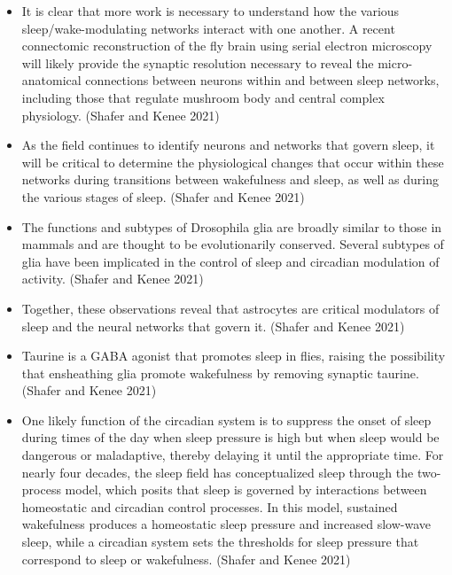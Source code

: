 \documentclass[11pt]{article}
\begin{document}
\begin{itemize}
    \item It is clear that more work is necessary to understand how the various sleep/wake-modulating networks interact with one another. A recent connectomic reconstruction of the fly brain using serial electron microscopy will likely provide the synaptic resolution necessary to reveal the micro-anatomical connections between neurons within and between sleep networks, including those that regulate mushroom body and central complex physiology.
    \parencite{shaferRegulationDrosophilaSleep2021} (Shafer and Kenee 2021)

    \item As the field continues to identify neurons and networks that govern sleep, it will be critical to determine the physiological changes that occur within these networks during transitions between wakefulness and sleep, as well as during the various stages of sleep.
    \parencite{shaferRegulationDrosophilaSleep2021} (Shafer and Kenee 2021)

    \item The functions and subtypes of Drosophila glia are broadly similar to those in mammals and are thought to be evolutionarily conserved.
    Several subtypes of glia have been implicated in the control of sleep and circadian modulation of activity.
    \parencite{shaferRegulationDrosophilaSleep2021} (Shafer and Kenee 2021)

    \item Together, these observations reveal that astrocytes are critical modulators of sleep and the neural networks that govern it.
    \parencite{shaferRegulationDrosophilaSleep2021} (Shafer and Kenee 2021)

    \item Taurine is a GABA agonist that promotes sleep in flies, raising the possibility that ensheathing glia promote wakefulness by removing synaptic taurine.
    \parencite{shaferRegulationDrosophilaSleep2021} (Shafer and Kenee 2021)

    \item One likely function of the circadian system is to suppress the onset of sleep during times of the day when sleep pressure is high but when sleep would be dangerous or maladaptive, thereby delaying it until the appropriate time.
    For nearly four decades, the sleep field has conceptualized sleep through the two-process model, which posits that sleep is governed by interactions between homeostatic and circadian control processes.
    In this model, sustained wakefulness produces a homeostatic sleep pressure and increased slow-wave sleep, while a circadian system sets the thresholds for sleep pressure that correspond to sleep or wakefulness.
    \parencite{shaferRegulationDrosophilaSleep2021} (Shafer and Kenee 2021)


\end{itemize}
\end{document}
